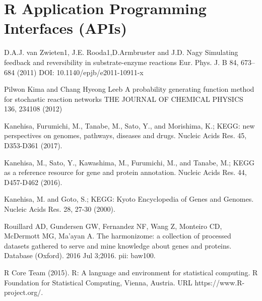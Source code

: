 \begin{enumerate}
\end{enumerate}

\section{R Application Programming Interfaces (APIs)}





\begin{thebibliography}{00}

 D.A.J. van Zwieten1, J.E. Rooda1,D.Armbruster and J.D. Nagy
\newblock Simulating feedback and reversibility in substrate-enzyme reactions
\newblock Eur. Phys. J. B 84, 673–684 (2011) DOI: 10.1140/epjb/e2011-10911-x

 Pilwon Kima and Chang Hyeong Leeb
\newblock A probability generating function method for stochastic reaction networks
\newblock THE JOURNAL OF CHEMICAL PHYSICS 136, 234108 (2012)

 Kanehisa, Furumichi, M., Tanabe, M., Sato, Y., and Morishima, K.; 
\newblock KEGG: new perspectives on genomes, pathways, diseases and drugs. 
\newblock Nucleic Acids Res. 45, D353-D361 (2017).

 Kanehisa, M., Sato, Y., Kawashima, M., Furumichi, M., and Tanabe, M.; 
\newblock KEGG as a reference resource for gene and protein annotation. 
\newblock Nucleic Acids Res. 44, D457-D462 (2016).

 Kanehisa, M. and Goto, S.; 
\newblock KEGG: Kyoto Encyclopedia of Genes and Genomes. 
\newblock Nucleic Acids Res. 28, 27-30 (2000). 

 Rouillard AD, Gundersen GW, Fernandez NF, Wang Z, Monteiro CD, McDermott MG, Ma'ayan A. 
\newblock The harmonizome: a collection of processed datasets gathered to serve and mine knowledge about genes and proteins. 
\newblock Database (Oxford). 2016 Jul 3;2016. pii: baw100.

R Core Team (2015). 
\newblock R: A language and environment for statistical computing. R Foundation for Statistical Computing, Vienna, Austria.
\newblock URL https://www.R-project.org/.


\end{thebibliography}

